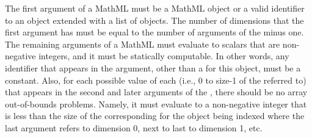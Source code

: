The first argument of a MathML  must be a MathML
 object or a valid identifier to an \SBase object extended
with a list of \Dimension objects.   The number of dimensions that the
first argument has must be equal to the number of arguments of the
 minus one. The remaining arguments of a MathML
 must evaluate to scalars that are non-negative integers, and it must be statically computable.   In other words, any identifier that appears in the argument, other than a \Dimension {} for this object, must be a constant.   Also, for each possible value of each \Dimension {}  (i.e., 0 to size-1 of the \Dimension referred to) that appears in the second and later arguments of the , there should be no array out-of-bounds problems.  
Namely, it must evaluate to a non-negative integer that is less than the size of the corresponding \Dimension for the object being indexed where the last argument refers to dimension 0, next to last to dimension 1, etc.

